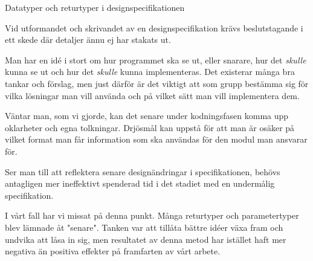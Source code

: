 Datatyper och returtyper i designspecifikationen

Vid utformandet och skrivandet av en designspecifikation krävs beslutstagande i ett skede där detaljer ännu ej har stakats ut.

Man har en idé i stort om hur programmet ska se ut, eller snarare, hur det \emph{skulle} kunna se ut och hur det \emph{skulle} kunna implementeras. Det existerar många bra tankar och förslag, men just därför är det viktigt att som grupp bestämma sig för vilka lösningar man vill använda och på vilket sätt man vill implementera dem.

Väntar man, som vi gjorde, kan det senare under kodningsfasen komma upp oklarheter och egna tolkningar. Drjösmål kan uppstå för att man är osäker på vilket format man får information som ska användas för den modul man ansvarar för.

Ser man till att reflektera senare designändringar i specifikationen, behövs antagligen mer ineffektivt spenderad tid i det stadiet med en undermålig specifikation.

I vårt fall har vi missat på denna punkt. Många returtyper och parametertyper blev lämnade åt "senare". Tanken var att tillåta bättre idéer växa fram och undvika att låsa in sig, men resultatet av denna metod har istället haft mer negativa än positiva effekter på framfarten av vårt arbete.